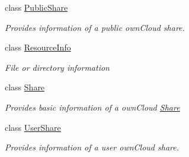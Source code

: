 \begin{DoxyCompactItemize}
class \hyperlink{classowncloudsharp_1_1_types_1_1_public_share}{Public\+Share}
\begin{DoxyCompactList}\small\item\em Provides information of a public own\+Cloud share. \end{DoxyCompactList}\item 
class \hyperlink{classowncloudsharp_1_1_types_1_1_resource_info}{Resource\+Info}
\begin{DoxyCompactList}\small\item\em File or directory information \end{DoxyCompactList}\item 
class \hyperlink{classowncloudsharp_1_1_types_1_1_share}{Share}
\begin{DoxyCompactList}\small\item\em Provides basic information of a own\+Cloud \hyperlink{classowncloudsharp_1_1_types_1_1_share}{Share} \end{DoxyCompactList}\item 
class \hyperlink{classowncloudsharp_1_1_types_1_1_user_share}{User\+Share}
\begin{DoxyCompactList}\small\item\em Provides information of a user own\+Cloud share. \end{DoxyCompactList}\end{DoxyCompactItemize}
